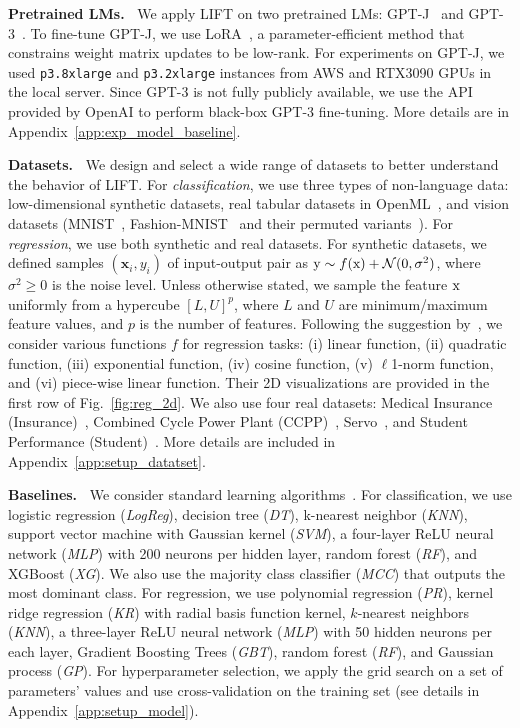 \textbf{Pretrained LMs.~} We apply \textsc{LIFT} on two pretrained LMs: GPT-J~\citep{gpt-j} and GPT-3~\citep{brown2020gpt3}. To fine-tune GPT-J, we use LoRA~\citep{hu2021lora}, a parameter-efficient method that constrains weight matrix updates to be low-rank. For experiments on GPT-J, we used \texttt{p3.8xlarge} and \texttt{p3.2xlarge} instances from AWS and RTX3090 GPUs in the local server. Since GPT-3 is not fully publicly available, we use the API provided by OpenAI to perform black-box GPT-3 fine-tuning. More details are in Appendix~\ref{app:exp_model_baseline}.

\textbf{Datasets.~}
We design and select a wide range of datasets to better understand the behavior of \textsc{LIFT}.
For \textit{classification}, we use three types of non-language data:  low-dimensional synthetic datasets, real tabular datasets in OpenML~\citep{OpenML2013}, and vision datasets (MNIST~\citep{lecun1998mnist}, Fashion-MNIST~\citep{xiao2017fashion} and their permuted variants~\citep{goodfellow2013empirical}). For \textit{regression}, we use both synthetic and real datasets. For synthetic datasets, we defined samples $({\bm{x}}_i, y_i)$ of input-output pair as ${\textnormal{y}} \sim f({\textnormal{x}}) + {\mathcal{N}}(0, \sigma^2)$,
where 
$\sigma^2 \geq 0$ is the noise level. Unless otherwise stated, we sample the feature ${\textnormal{x}}$ uniformly from a hypercube $[L,U]^p$, where $L$ and $U$ are minimum/maximum feature values, and $p$ is the number of features. Following the suggestion by~\citep{xu2020neural}, we consider various functions $f$ for regression tasks: (i) linear function, (ii) quadratic function, (iii) exponential function, (iv) cosine function, (v) $\ell$1-norm function, and (vi) piece-wise linear function. Their 2D visualizations are provided in the first row of Fig.~\ref{fig:reg_2d}.
We also use four real datasets: Medical Insurance (Insurance)~\citep{medins}, Combined Cycle Power Plant (CCPP)~\citep{cccp}, Servo~\citep{servo}, and Student Performance (Student)~\citep{cortez2008using}. More details are included in Appendix~\ref{app:setup_datatset}.

\textbf{Baselines.~} 
We consider standard learning algorithms~\citep{shalev2014understanding,Borisov2021-uo}. For classification, we use logistic regression (\textit{LogReg}), decision tree (\textit{DT}), k-nearest neighbor (\textit{KNN}), support vector machine with Gaussian kernel (\textit{SVM}), a four-layer ReLU neural network (\textit{MLP}) with 200 neurons per hidden layer, random forest (\textit{RF}), and XGBoost (\textit{XG}). We also use the majority class classifier (\textit{MCC}) that outputs the most dominant class. For regression, we use polynomial regression (\textit{PR}), kernel ridge regression (\textit{KR}) with radial basis function kernel, $k$-nearest neighbors (\textit{KNN}), a three-layer ReLU neural network (\textit{MLP}) with 50 hidden neurons per each layer, Gradient Boosting Trees (\textit{GBT}), random forest (\textit{RF}), and Gaussian process (\textit{GP}).
For hyperparameter selection, we apply the grid search on a set of parameters' values and use cross-validation on the training set (see details in Appendix~\ref{app:setup_model}).

